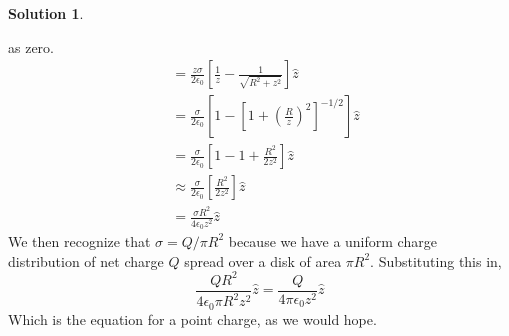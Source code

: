 \documentclass[10pt]{article}
\theoremstyle{definition}
\newtheorem{soln}{Solution}
\newcommand{\uz}{\hat{z}}
\begin{document}
\begin{soln}
\begin{enumerate}[label=(\alph*)]
          as zero.
          \begin{align*}
             & =\frac{z\sigma}{2\epsilon_0}\left[\frac{1}{z}-\frac{1}{\sqrt{R^2+z^2}}\right]\uz                \\
             & =\frac{\sigma}{2\epsilon_0}\left[1-\left[1+\left(\frac{R}{z}\right)^2\right]^{-1/2}\right]\uz \\
             & =\frac{\sigma}{2\epsilon_0}\left[1-1+\frac{R^2}{2z^2}\right]\uz \\
             & \approx\frac{\sigma}{2\epsilon_0}\left[\frac{R^2}{2z^2}\right] \uz                              \\
             & =\frac{\sigma R^2}{4\epsilon_0z^2}\uz
          \end{align*}
          We then recognize that $\sigma=Q/\pi R^2$ because we have a uniform charge distribution of net charge $Q$ spread over a disk of area $\pi R^2$.
          Substituting this in,
          $$
            \frac{QR^2}{4\epsilon_0\pi R^2z^2}\uz=\frac{Q}{4\pi\epsilon_0 z^2}\uz
          $$
          Which is the equation for a point charge, as we would hope.
  \end{enumerate}
\end{soln}
\end{document}
